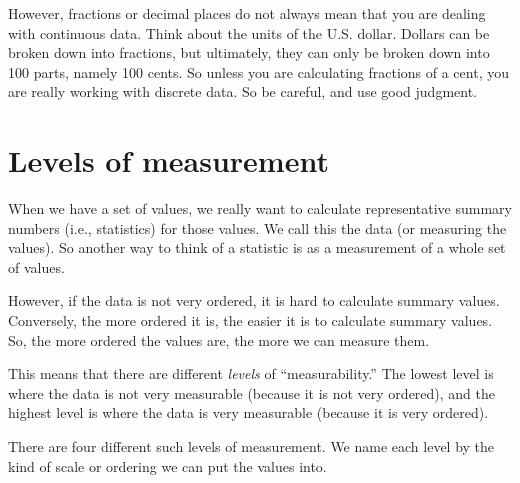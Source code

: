 \documentclass[../../../main.tex]{subfiles}
\begin{document}
However, fractions or decimal places do not always mean that you are dealing with continuous data. Think about the units of the U.S. dollar. Dollars can be broken down into fractions, but ultimately, they can only be broken down into 100 parts, namely 100 cents. So unless you are calculating fractions of a cent, you are really working with discrete data. So be careful, and use good judgment. 


\section{Levels of measurement}

When we have a set of values, we really want to calculate representative summary numbers (i.e., statistics) for those values. We call this  the data (or measuring the values). So another way to think of a statistic is as a measurement of a whole set of values. 

However, if the data is not very ordered, it is hard to calculate summary values. Conversely, the more ordered it is, the easier it is to calculate summary values. So, the more ordered the values are, the more we can measure them.

This means that there are different \emph{levels} of ``measurability.'' The lowest level is where the data is not very measurable (because it is not very ordered), and the highest level is where the data is very measurable (because it is very ordered). 

There are four different such levels of measurement. We name each level by the kind of scale or ordering we can put the values into.
\end{document}
